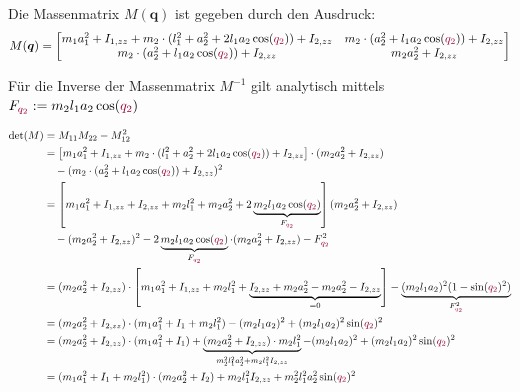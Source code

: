 \documentclass[a4paper, 12pt]{scrartcl}
\newcommand{\dunkelrot}[2][dunkelrot]{\textcolor{#1}{#2}}
\begin{document}
Die Massenmatrix $M(\bm{q})$ ist gegeben durch den Ausdruck:
\begin{align*}
    M(\bm{q})
    =
    \begin{bmatrix}
        m_1 a_1^2 + I_{1,zz} + m_2 \cdot (l_1^2 +a_2^2 + 2 l_1 a_2  \cos(\dunkelrot{q_{2}}) ) + I_{2,zz}
        &  m_2 \cdot (a_2^2 +  l_1 a_2  \cos(\dunkelrot{q_{2}})) + I_{2,zz} \\
        m_2 \cdot (a_2^2 +  l_1 a_2  \cos(\dunkelrot{q_{2}})) + I_{2,zz}
        & m_2 a_2^2 + I_{2,zz}
    \end{bmatrix}
\end{align*}


Für die Inverse der Massenmatrix $M^{-1}$ gilt analytisch 
mittels $F_{\dunkelrot{q_2}} := m_2 l_1 a_2 \cos(\dunkelrot{q_{2}})$

\begin{align*}
    \det(M) &= M_{11} M_{22} - M_{12}^2 \\
            &= \left[ m_1 a_1^2 + I_{1,zz} + m_2 \cdot (l_1^2 +a_2^2 + 2 l_1 a_2  
            \cos(\dunkelrot{q_{2}}) ) + I_{2,zz} \right]
             \cdot (m_2 a_2^2 + I_{2,zz}) \\
            &\quad - (m_2 \cdot (a_2^2 +  l_1 a_2  \cos(\dunkelrot{q_{2}})) + I_{2,zz})^2 \\
            &= 
            \left[
            m_1 a_1^2 + I_{1,zz} + I_{2,zz} + m_2 l_1^2 +m_2 a_2^2 + 
            2 \underbrace{m_2 l_1 a_2  
            \cos(\dunkelrot{q_{2}})}_{F_{\dunkelrot{q_{2}}}} 
            \right] 
            (m_2 a_2^2 + I_{2,zz}) \\ 
            &\quad
            - (m_2 a_2^2 + I_{2,zz})^2
            - 2 \underbrace{m_2 l_1 a_2 \cos(\dunkelrot{q_{2}})}_{F_{\dunkelrot{q_{2}}}}
            \cdot (m_2 a_2^2 + I_{2,zz})
            - F_{\dunkelrot{q_{2}}}^2 \\
            &= 
            (m_2 a_2^2 + I_{2,zz}) \cdot 
            \left[
                m_1 a_1^2 + I_{1,zz} + m_2 l_1^2 +
                \underbrace{I_{2,zz}  + m_2 a_2^2 - m_2 a_2^2 - I_{2,zz}}_{= 0}
            \right]
            - \underbrace{
                (m_2 l_1 a_2 )^2 (1- \sin(\dunkelrot{q_{2}})^2)
                }_{F_{\dunkelrot{q_{2}}}^2}
            \\
            &= 
            (m_2 a_2^2 + I_{2,zz}) \cdot (m_1 a_1^2 + I_1 + m_2 l_1^2)
            - (m_2 l_1 a_2 )^2 + (m_2 l_1 a_2 )^2 \sin(\dunkelrot{q_{2}})^2
            \\
            &= (m_2 a_2^2 + I_{2,zz}) \cdot (m_1 a_1^2 + I_1) 
            + \underbrace{
                (m_2 a_2^2 + I_{2,zz}) \cdot m_2 l_1^2
            }_{m_2^2 l_1^2 a_2^2+ m_2 l_1^2 I_{2,zz}}
            - (m_2 l_1 a_2 )^2 + (m_2 l_1 a_2 )^2 \sin(\dunkelrot{q_{2}})^2
            \\
            &= (m_1 a_1^2 + I_1 + m_2 l_1^2)
            \cdot (m_2 a_2^2 + I_2) 
            + m_2 l_1^2 I_{2,zz}
            + m_2^2 l_1^2 a_2^2  \sin(\dunkelrot{q_{2}})^2
\end{align*}
\end{document}
